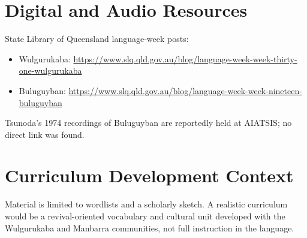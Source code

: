 \documentclass[12pt]{article}
\begin{document}
\section{Digital and Audio Resources}
State Library of Queensland language-week posts:
\begin{itemize}
\item Wulgurukaba: \url{https://www.slq.qld.gov.au/blog/language-week-week-thirty-one-wulgurukaba}
\item Buluguyban: \url{https://www.slq.qld.gov.au/blog/language-week-week-nineteen-buluguyban}
\end{itemize}
Tsunoda's 1974 recordings of Buluguyban are reportedly held at AIATSIS; no direct link was found.

\section{Curriculum Development Context}
Material is limited to wordlists and a scholarly sketch. A realistic curriculum would be a revival-oriented vocabulary and cultural unit developed with the Wulgurukaba and Manbarra communities, not full instruction in the language.
\end{document}
